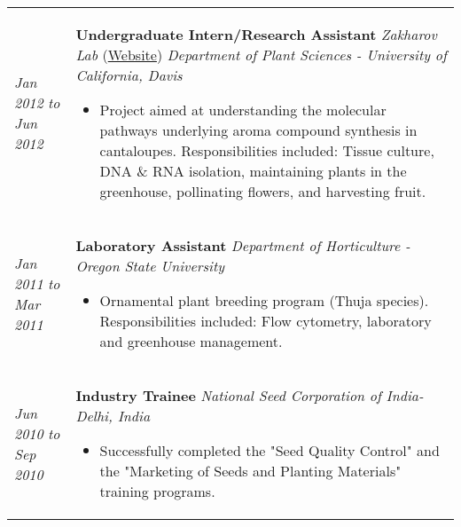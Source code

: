 ﻿\documentclass[a4paper]{article}
\begin{document}
\begin{tabular}{p{3cm} p{14cm}}

\vspace{0pt} 
\textit{Jan 2012}\newline
\textit{to}\newline
\textit{Jun 2012}\newline
&
\vspace{0pt}

\textbf{Undergraduate Intern/Research Assistant}\newline
\textit{Zakharov Lab} (\href{http://www.plantsciences.ucdavis.edu/faculty/zakharov/}{Website})\newline
\textit{Department of Plant Sciences - University of California, Davis}
\begin{itemize}[noitemsep,topsep=0pt]
  \item Project aimed at understanding the molecular pathways underlying aroma compound synthesis in cantaloupes. Responsibilities included: Tissue culture, DNA \& RNA isolation, maintaining plants in the greenhouse, pollinating flowers, and harvesting fruit.
\end{itemize}
%
\\
%
\vspace{0pt} 
\textit{Jan 2011}\newline
\textit{to}\newline
\textit{Mar 2011}\newline
&
\vspace{0pt}
\textbf{Laboratory Assistant}\newline
\textit{Department of Horticulture - Oregon State University}
\begin{itemize}[noitemsep,topsep=0pt]
  \item Ornamental plant breeding program (Thuja species). Responsibilities included: Flow cytometry, laboratory and greenhouse management.
\end{itemize}
%
\\
%
\vspace{0pt} 
\textit{Jun 2010}\newline
\textit{to}\newline
\textit{Sep 2010}\newline
&
\vspace{0pt}
\textbf{Industry Trainee}\newline
\textit{National Seed Corporation of India- Delhi, India}
\begin{itemize}[noitemsep,topsep=0pt]
  \item Successfully completed the "Seed Quality Control" and the "Marketing of Seeds and Planting Materials" training programs.

\end{itemize}
\end{tabular}
\end{document}
